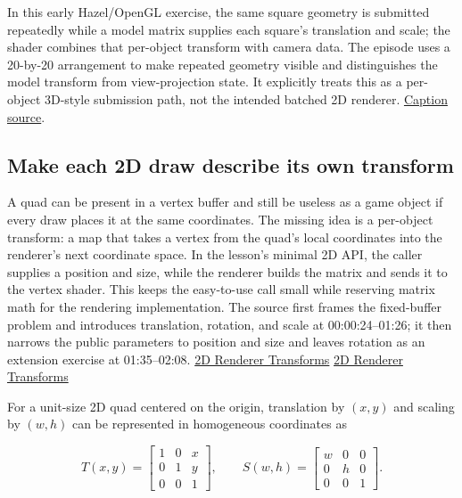 \hypertarget{06-engine-ii-ch025-reuse-geometry-while-varying-the-object-transform}{}

In this early Hazel/OpenGL exercise, the same square geometry is submitted repeatedly while a model matrix supplies each square's translation and scale; the shader combines that per-object transform with camera data. The episode uses a 20-by-20 arrangement to make repeated geometry visible and distinguishes the model transform from view-projection state. It explicitly treats this as a per-object 3D-style submission path, not the intended batched 2D renderer. \href{https://www.youtube.com/watch?v=cbB2fh0UxZ0}{Caption source}.

\subsection{Make each 2D draw describe its own transform}\label{06-engine-ii-ch025-make-each-2d-draw-describe-its-own-transform}

\hypertarget{06-engine-ii-ch025-make-each-2d-draw-describe-its-own-transform}{}

A quad can be present in a vertex buffer and still be useless as a game object if every draw places it at the same coordinates. The missing idea is a per-object transform: a map that takes a vertex from the quad's local coordinates into the renderer's next coordinate space. In the lesson's minimal 2D API, the caller supplies a position and size, while the renderer builds the matrix and sends it to the vertex shader. This keeps the easy-to-use call small while reserving matrix math for the rendering implementation. The source first frames the fixed-buffer problem and introduces translation, rotation, and scale at 00:00:24--01:26; it then narrows the public parameters to position and size and leaves rotation as an extension exercise at 01:35--02:08. \href{https://www.youtube.com/watch?v=-Qt12lcAF0Y&t=24s}{2D Renderer Transforms} \href{https://www.youtube.com/watch?v=-Qt12lcAF0Y&t=95s}{2D Renderer Transforms}

For a unit-size 2D quad centered on the origin, translation by \((x,y)\) and scaling by \((w,h)\) can be represented in homogeneous coordinates as

\[
T(x,y)=\begin{bmatrix}1&0&x\\0&1&y\\0&0&1\end{bmatrix},\qquad
S(w,h)=\begin{bmatrix}w&0&0\\0&h&0\\0&0&1\end{bmatrix}.
\]

